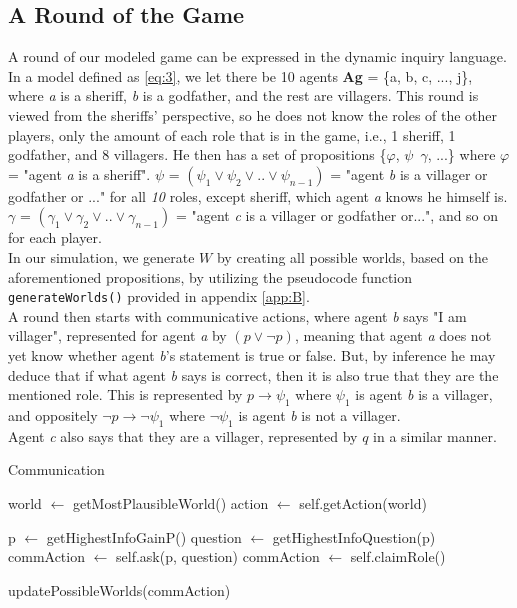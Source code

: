 \subsection{A Round of the Game}\label{ARoundOfTheGame}
A round of our modeled game can be expressed in the dynamic inquiry language.
In a model defined as \cref{eq:3}, we let there be 10 agents \textbf{Ag} = \{a,
b, c, ..., j\}, where \textit{a} is a sheriff, \textit{b} is a godfather, and
the rest are villagers. This round is viewed from the sheriffs' perspective, so
he does not know the roles of the other players, only the amount of each role
that is in the game, i.e., 1 sheriff, 1 godfather, and 8 villagers. He then has
a set of propositions \{$\varphi$, $\psi$\, $\gamma$, ...\} where $\varphi$ =
"agent \textit{a} is a sheriff". $\psi$ = $(\psi_1 \lor \psi_2 \lor .. \lor
	\psi_{n-1})$ = "agent \textit{b} is a villager or godfather or ..." for all
\textit{10} roles, except sheriff, which agent \textit{a} knows he himself is.
$\gamma$ = $(\gamma_1 \lor \gamma_2 \lor .. \lor \gamma_{n-1}) $ = "agent
\textit{c} is a villager or godfather or...", and so on for each player. \\ In
our simulation, we generate $W$ by creating all possible worlds, based on the
aforementioned propositions, by utilizing the pseudocode function
\lstinline{generateWorlds()} provided in appendix \ref{app:B}. \\ A round then
starts with communicative actions, where agent \textit{b} says "I am villager",
represented for agent \textit{a} by $(p \lor \neg p)$, meaning that agent
\textit{a} does not yet know whether agent \textit{b}'s statement is true or
false. But, by inference he may deduce that if what agent \textit{b} says is
correct, then it is also true that they are the mentioned role. This is
represented by $p \rightarrow \psi_1$ where $\psi_1$ is agent \textit{b} is a
villager, and oppositely $\neg p \rightarrow \neg \psi_1$ where $\neg \psi_1$
is agent \textit{b} is not a villager. \\ Agent \textit{c} also says that they
are a villager, represented by $q$ in a similar manner.

\begin{algorithm}
	\caption{Communication}
	\begin{algorithmic}[1]
		\State world $\gets$ getMostPlausibleWorld()
		\State action $\gets$ self.getAction(world)

		\State p $\gets$ getHighestInfoGainP()
		\State question $\gets$ getHighestInfoQuestion(p)
		\State commAction $\gets$ self.ask(p, question)
		\State commAction $\gets$ self.claimRole()
		\EndIf

		\State updatePossibleWorlds(commAction)
		\EndFunction
	\end{algorithmic}
\end{algorithm}\label{lst:communicate}

